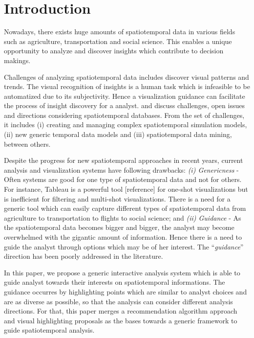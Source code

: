\documentclass{sig-alternate-05-2015}
\begin{document}


\section{Introduction} 

Nowadays, there exists huge amounts of spatiotemporal data in various fields
such as agriculture, transportation and social science. This enables
a unique opportunity to analyze and discover insights which contribute to
decision makings.    

Challenges of analyzing spatiotemporal data includes discover visual patterns
and trends. The visual recognition of insights is a human task which is
infeasible to be automatized due to its subjectivity. Hence a visualization
guidance can facilitate the process of insight discovery for a analyst.
\cite{RoddickEHPS04} and \cite{Telang:2012} discuss challenges, open issues and
directions considering spatiotemporal databases. From the set of challenges, it
includes (i) creating and managing complex spatiotemporal simulation models,
(ii) new generic temporal data models and (iii) spatiotemporal data mining,
between others.         


Despite the progress for new spatiotemporal approaches in recent years, current
analysis and visualization systems have following drawbacks: \textit{(i)
Genericness} - Often systems are good for one type of spatiotemporal data and
not for others. For instance, Tableau is a powerful tool [reference] for
one-shot visualizations but is inefficient for filtering and multi-shot
visualizations. There is a need for a generic tool which can easily capture
different types of spatiotemporal data from agriculture to transportation to
flights to social science; and \textit{(ii) Guidance} - As the spatiotemporal
data becomes bigger and bigger, the analyst may become overwhelmed with the
gigantic amount of information. Hence there is a need to guide the analyst
through options which may be of her interest. The ``\textit{guidance}''
direction has been poorly addressed in the literature.            


In this paper, we propose a generic interactive analysis system which is able to
guide analyst towards their interests on spatiotemporal informations. The
guidance occurres by highlighting points which are similar to analyst choices and are as diverse as possible, so
that the analysis can consider different analysis directions. For that, this
paper merges a recommendation algorithm approach \cite{Omidvar-Tehrani:2015} and
visual highlighting proposals \cite{Lohmann:2012,Robinson2011,Liang2010} as the
bases towards a generic framework to guide spatiotemporal analysis.
\end{document}
